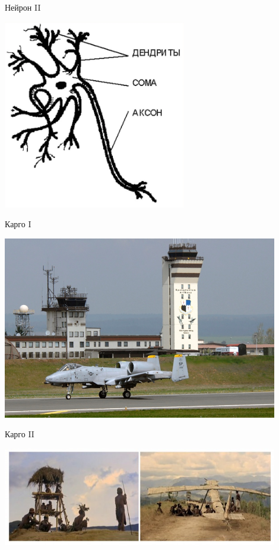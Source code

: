 \documentclass[14pt, fleqn, xcolor={dvipsnames, table}]{beamer}
\begin{document}
\begin{frame}{Нейрон II}
\begin{center}
\includegraphics[width=0.6\textwidth]{neuron_simple}
\end{center}
\end{frame}

\begin{frame}{Карго I}
\begin{center}
\includegraphics[width=0.9\textwidth]{good_cargo}
\end{center}
\end{frame}


\begin{frame}{Карго II}
\begin{center}
\includegraphics[width=0.9\textwidth]{cult_cargo}
\end{center}
\end{frame}
\end{document}
